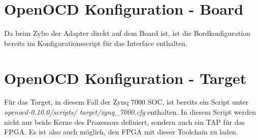 \section{OpenOCD Konfiguration - Board}
Da beim Zybo der Adapter direkt auf dem Board ist, ist die Bordkonfiguration bereits im Konfigurationsscript für das Interface enthalten.

\section{OpenOCD Konfiguration - Target}
Für das Target, in diesem Fall der Zynq 7000 SOC, ist bereits ein Script unter \textit{openocd-0.10.0/scripts/ target/zynq\_7000.cfg} enthalten.
In diesem Script werden nicht nur beide Kerne des Prozessors definiert, sondern auch ein TAP für das FPGA.
Es ist also auch möglich, den FPGA mit dieser Toolchain zu laden.
